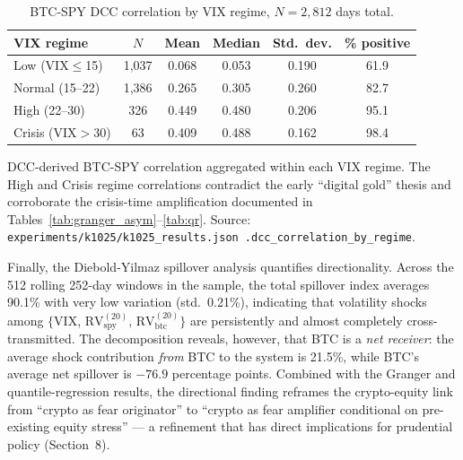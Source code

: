 \documentclass[11pt,a4paper]{article}
\begin{document}
\begin{table}[H]
\centering
\caption{BTC-SPY DCC correlation by VIX regime, $N = 2{,}812$ days total.}
\label{tab:dcc}
\begin{tabular}{lccccc}
\toprule
VIX regime    & $N$  & Mean & Median & Std.\ dev. & \% positive \\
\midrule
Low (VIX$\le$15)        & 1{,}037 & 0.068 & 0.053 & 0.190 & 61.9 \\
Normal (15--22)         & 1{,}386 & 0.265 & 0.305 & 0.260 & 82.7 \\
High (22--30)           & 326   & 0.449 & 0.480 & 0.206 & 95.1 \\
Crisis (VIX$>$30)       & 63    & 0.409 & 0.488 & 0.162 & 98.4 \\
\bottomrule
\end{tabular}
\begin{flushleft}
\footnotesize DCC-derived BTC-SPY correlation aggregated within each VIX regime. The High and Crisis regime correlations contradict the early ``digital gold'' thesis and corroborate the crisis-time amplification documented in Tables~\ref{tab:granger_asym}--\ref{tab:qr}. Source: \texttt{experiments/k1025/k1025\_results.json .dcc\_correlation\_by\_regime}.
\end{flushleft}
\end{table}

Finally, the Diebold-Yilmaz spillover analysis quantifies directionality. Across the 512 rolling 252-day windows in the sample, the total spillover index averages 90.1\% with very low variation (std.\ 0.21\%), indicating that volatility shocks among $\{$VIX, $\text{RV}^{(20)}_{\text{spy}}$, $\text{RV}^{(20)}_{\text{btc}}\}$ are persistently and almost completely cross-transmitted. The decomposition reveals, however, that BTC is a \emph{net receiver}: the average shock contribution \emph{from} BTC to the system is 21.5\%, while BTC's average net spillover is $-76.9$ percentage points.%
 Combined with the Granger and quantile-regression results, the directional finding reframes the crypto-equity link from ``crypto as fear originator'' to ``crypto as fear amplifier conditional on pre-existing equity stress'' --- a refinement that has direct implications for prudential policy (Section~8).
\end{document}
